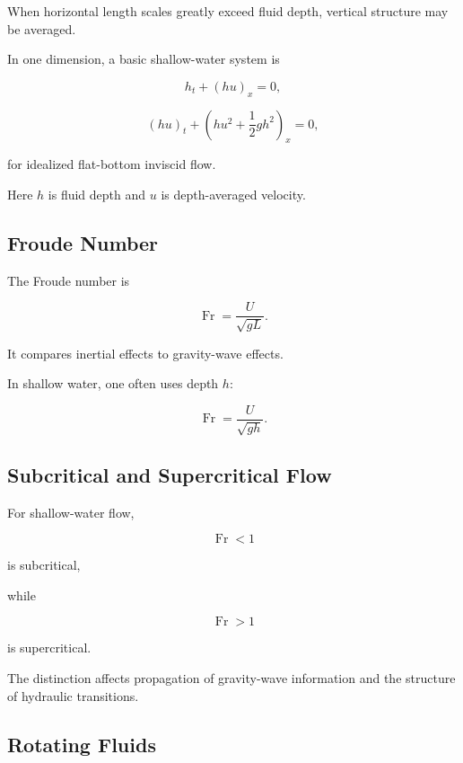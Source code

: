 When horizontal length scales greatly exceed fluid depth, vertical structure
may be averaged.

In one dimension, a basic shallow-water system is

\[
\boxed{
h_t+(hu)_x=0,
}
\]

\[
\boxed{
(hu)_t
+
\left(
hu^2+\frac12gh^2
\right)_x
=
0,
}
\]

for idealized flat-bottom inviscid flow.

Here \(h\) is fluid depth and \(u\) is depth-averaged velocity.

\subsection{Froude Number}
\label{subsec:froude-number}

The Froude number is

\[
\boxed{
\operatorname{Fr}
=
\frac{U}{\sqrt{gL}}.
}
\]

It compares inertial effects to gravity-wave effects.

In shallow water, one often uses depth \(h\):

\[
\boxed{
\operatorname{Fr}
=
\frac{U}{\sqrt{gh}}.
}
\]

\subsection{Subcritical and Supercritical Flow}
\label{subsec:subcritical-supercritical}

For shallow-water flow,

\[
\boxed{
\operatorname{Fr}<1
}
\]

is subcritical,

while

\[
\boxed{
\operatorname{Fr}>1
}
\]

is supercritical.

The distinction affects propagation of gravity-wave information and the
structure of hydraulic transitions.

\subsection{Rotating Fluids}
\label{subsec:rotating-fluids}


